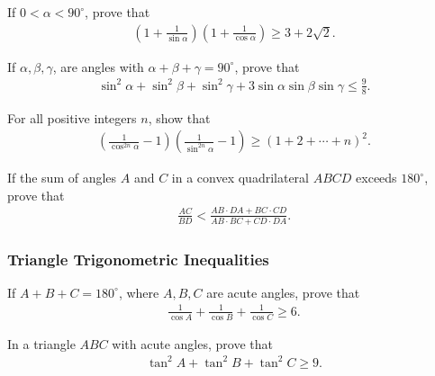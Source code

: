 \documentclass[12pt,a4paper]{memoir}
\theoremstyle{definition}
\begin{document}
\begin{question}
	If $0<\alpha<90^\circ$, prove that
	\begin{align*}
		\left(1+\frac{1}{\sin\alpha}\right)\left(1+\frac{1}{\cos\alpha}\right) \geq 3 + 2\sqrt 2.
	\end{align*}
\end{question}


\begin{question}
	If $\alpha,\beta,\gamma$, are angles with $\alpha+\beta+\gamma=90^\circ$, prove that
	\begin{align*}
		\sin^2 \alpha + \sin^2 \beta + \sin^2 \gamma + 3\sin\alpha\sin\beta\sin\gamma \leq \frac{9}{8}. 
	\end{align*}
\end{question}

\begin{question}
	For all positive integers $n$, show that
	\begin{align*}
		\left(\frac{1}{\cos^{2n}\alpha}-1\right)\left(\frac{1}{\sin^{2n}\alpha}-1\right) \geq \left(1+2+\cdots+n\right)^2.
	\end{align*}
\end{question}


\begin{question}
	If the sum of angles $A$ and $C$ in a convex quadrilateral $ABCD$ exceeds $180^\circ$, prove that
	\begin{align*}
		\frac{AC}{BD} < \frac{AB \cdot DA + BC \cdot CD}{AB\cdot BC + CD \cdot DA}.
	\end{align*}
\end{question}


\subsubsection{Triangle Trigonometric Inequalities}


\begin{question}
	If $A+B+C=180^\circ$, where $A,B,C$ are acute angles, prove that
	\begin{align*}
		\frac{1}{\cos A}+\frac{1}{\cos B}+\frac{1}{\cos C} \geq 6.
	\end{align*}
\end{question}


\begin{question}
	In a triangle $ABC$ with acute angles, prove that
	\begin{align*}
		\tan^2 A + \tan^2 B + \tan^2 C \geq 9.
	\end{align*}
\end{question}
\end{document}

